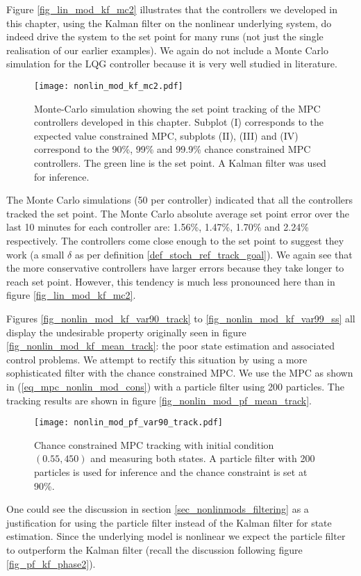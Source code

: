 Figure \ref{fig_lin_mod_kf_mc2} illustrates that the controllers we developed in this chapter, using the Kalman filter on the nonlinear underlying system, do indeed drive the system to the set point for many runs (not just the single realisation of our earlier examples). We again do not include a Monte Carlo simulation for the LQG controller because it is very well studied in literature.
\begin{figure}[H] 
\centering
\texttt{[image: nonlin\_mod\_kf\_mc2.pdf]}
\caption{Monte-Carlo simulation showing the set point tracking of the MPC controllers developed in this chapter. Subplot (I) corresponds to the expected value constrained MPC, subplots (II), (III) and (IV) correspond to the 90\%, 99\% and 99.9\% chance constrained MPC controllers. The green line is the set point. A Kalman filter was used for inference.}
\label{fig_nonlin_mod_kf_mc2}
\end{figure}
The Monte Carlo simulations (50 per controller) indicated that all the controllers tracked the set point. The Monte Carlo absolute average set point error over the last 10 minutes for each controller are: 1.56\%, 1.47\%, 1.70\% and 2.24\% respectively. The controllers come close enough to the set point to suggest they work (a small $\delta$ as per definition \ref{def_stoch_ref_track_goal}). We again see that the more conservative controllers have larger errors because they take longer to reach set point. However, this tendency is much less pronounced here than in figure \ref{fig_lin_mod_kf_mc2}.

Figures \ref{fig_nonlin_mod_kf_var90_track} to \ref{fig_nonlin_mod_kf_var99_ss} all display the undesirable property originally seen in figure \ref{fig_nonlin_mod_kf_mean_track}: the poor state estimation and associated control problems. We attempt to rectify this situation by using a more sophisticated filter with the chance constrained MPC. We use the MPC as shown in (\ref{eq_mpc_nonlin_mod_cons}) with a particle filter using 200 particles. The tracking results are shown in figure \ref{fig_nonlin_mod_pf_mean_track}. 
\begin{figure}[H] 
\centering
\texttt{[image: nonlin\_mod\_pf\_var90\_track.pdf]}
\caption{Chance constrained MPC tracking with initial condition $(0.55, 450)$ and measuring both states. A particle filter with 200 particles is used for inference and the chance constraint is set at 90\%.}
\label{fig_nonlin_mod_pf_var90_track}
\end{figure}
One could see the discussion in section \ref{sec_nonlinmods_filtering} as a justification for using the particle filter instead of the Kalman filter for state estimation. Since the underlying model is nonlinear we expect the particle filter to outperform the Kalman filter (recall the discussion following figure \ref{fig_pf_kf_phase2}).

